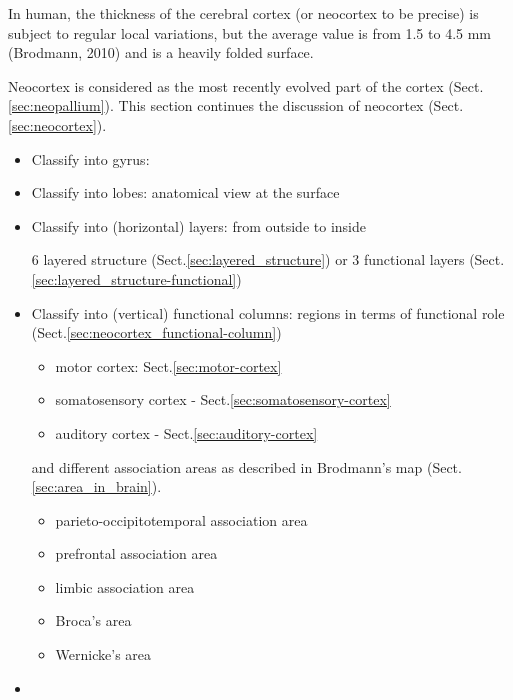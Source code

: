 In human, the thickness of the cerebral cortex (or neocortex to be precise) is
subject to regular local variations, but the average value is from 1.5 to 4.5 mm
(Brodmann, 2010) and is a heavily folded surface.

Neocortex is considered as  the most recently evolved part of the cortex
(Sect.\ref{sec:neopallium}). This section continues the discussion of neocortex
(Sect.\ref{sec:neocortex}).
\begin{itemize}
  \item Classify into gyrus: 
  
  \item Classify into lobes: anatomical view at the surface
  
  \item Classify into (horizontal) layers: from outside to inside
  
  6 layered structure (Sect.\ref{sec:layered_structure}) or 3 functional layers
  (Sect.\ref{sec:layered_structure-functional})
   
  \item Classify into (vertical) functional columns: regions in terms of
  functional role (Sect.\ref{sec:neocortex_functional-column})


\begin{itemize}
  \item motor cortex: Sect.\ref{sec:motor-cortex}
  \item somatosensory cortex - Sect.\ref{sec:somatosensory-cortex}
  \item auditory cortex - Sect.\ref{sec:auditory-cortex}
\end{itemize}
and different association areas as described in Brodmann's map
(Sect.\ref{sec:area_in_brain}).
\begin{itemize}
  \item parieto-occipitotemporal association area
  \item prefrontal association area
  \item limbic association area
  \item Broca's area
  \item Wernicke's area
\end{itemize}

  \item 

\end{itemize}





